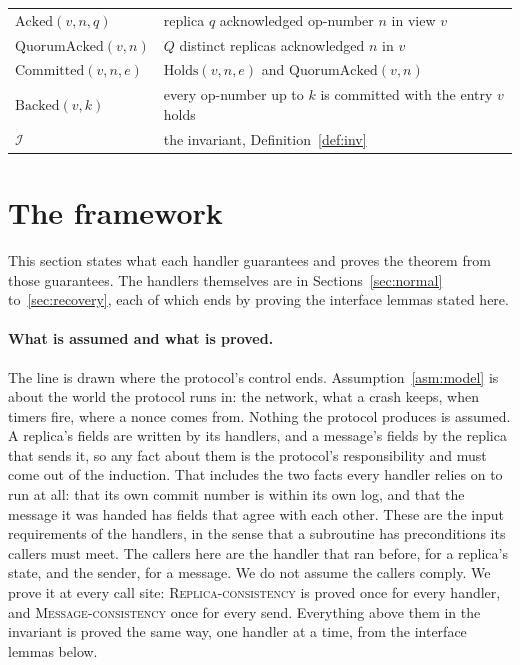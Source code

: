 \documentclass[11pt,a4paper]{article}
\theoremstyle{plain}
\theoremstyle{definition}
\theoremstyle{remark}
\newcommand{\Inv}{\mathcal{I}}
\newcommand{\Holds}{\mathrm{Holds}}
\newcommand{\Acked}{\mathrm{Acked}}
\newcommand{\QuorumAcked}{\mathrm{QuorumAcked}}
\newcommand{\Committed}{\mathrm{Committed}}
\newcommand{\Backed}{\mathrm{Backed}}
\newcommand{\Local}{\textsc{Replica-consistency}}
\newcommand{\WellFormed}{\textsc{Message-consistency}}
\begin{document}
\begin{table}[t]
\begin{tabular}{@{}ll@{}}
$\Acked(v, n, q)$ & replica $q$ acknowledged op-number $n$ in view $v$ \\
$\QuorumAcked(v, n)$ & $Q$ distinct replicas acknowledged $n$ in $v$ \\
$\Committed(v, n, e)$ & $\Holds(v, n, e)$ and $\QuorumAcked(v, n)$ \\
$\Backed(v, k)$ & every op-number up to $k$ is committed with the entry $v$ holds \\
$\Inv$ & the invariant, Definition~\ref{def:inv} \\
\bottomrule
\end{tabular}
\end{table}

\section{The framework}
\label{sec:framework}

This section states what each handler guarantees and proves the theorem
from those guarantees. The handlers themselves are in
Sections~\ref{sec:normal} to~\ref{sec:recovery}, each of which ends by
proving the interface lemmas stated here.

\paragraph{What is assumed and what is proved.} The line is drawn
where the protocol's control ends. Assumption~\ref{asm:model} is about
the world the protocol runs in: the network, what a crash keeps, when
timers fire, where a nonce comes from. Nothing the protocol produces is
assumed. A replica's fields are written by its handlers, and a message's
fields by the replica that sends it, so any fact about them is the
protocol's responsibility and must come out of the induction. That
includes the two facts every handler relies on to run at all: that its
own commit number is within its own log, and that the message it was
handed has fields that agree with each other. These are the input
requirements of the handlers, in the sense that a subroutine has
preconditions its callers must meet. The callers here are the handler
that ran before, for a replica's state, and the sender, for a message.
We do not assume the callers comply. We prove it at every call site:
\Local{} is proved once for every handler, and \WellFormed{} once for
every send. Everything above them in the invariant is proved the same
way, one handler at a time, from the interface lemmas below.
\end{document}
